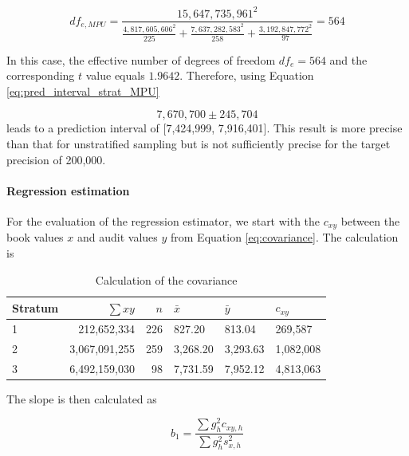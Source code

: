 \begin{equation*}
df_{e, MPU} = \frac{15,647,735,961^2}{\frac{4,817,605,606^2}{225} + \frac{7,637,282,583^2}{258} + \frac{3,192,847,772^2}{97}} = 564
\end{equation*}

In this case, the effective number of degrees of freedom $df_e = 564$ and the corresponding $t$ value equals $1.9642$. Therefore, using Equation \ref{eq:pred_interval_strat_MPU} 

\begin{equation*}
7,670,700 \pm 245,704
\end{equation*}
leads to a prediction interval of [7,424,999,\hspace{0.5em} 7,916,401]. This result is more precise than that for unstratified sampling but is not sufficiently precise for the target precision of 200,000.

\bigskip
\paragraph{Regression estimation} For the evaluation of the regression estimator, we start with the  $c_{xy}$ between the book values $x$ and audit values $y$ from Equation \ref{eq:covariance}. The calculation is

\begin{table}[htbp]
\begin{tabularx}{\textwidth}{@{}lrrYYY@{}}
\toprule
Stratum &
\parbox[t]{2cm}{\raggedleft $\sum{x y}$} &
\parbox[t]{1cm}{\raggedleft $n$} &
$\bar{x}$ &
$\bar{y}$ &
$c_{xy}$ \\

\midrule

1 &   212,652,334 & 226 &   827.20 &   813.04 &   269,587 \\
2 & 3,067,091,255 & 259 & 3,268.20 & 3,293.63 & 1,082,008 \\
3 & 6,492,159,030 &  98 & 7,731.59 & 7,952.12 & 4,813,063 \\

\bottomrule
\end{tabularx}
\caption{Calculation of the covariance}
\label{tab:covariance}
\end{table}

The slope is then calculated as

\begin{equation}
b_1 = \frac{\sum{g_h^2 c_{xy, h}}}{\sum{g_h^2 s_{x, h}^2}}
\end{equation}


